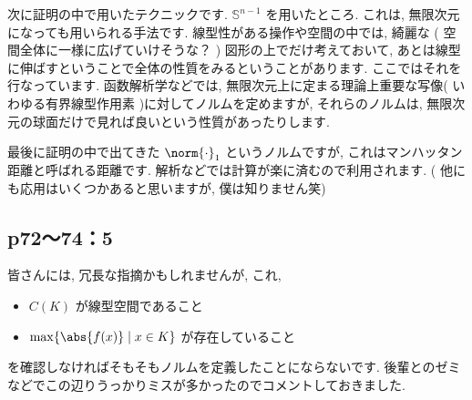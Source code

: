 \documentclass[uplatex,dvipdfmx,a4paper,10pt,fleqn]{jsarticle}
\begin{document}
次に証明の中で用いたテクニックです.  $\mathbb{S}^{n-1}$ を用いたところ. これは, 無限次元になっても用いられる手法です. 線型性がある操作や空間の中では, 綺麗な ( 空間全体に一様に広げていけそうな？ ) 図形の上でだけ考えておいて, あとは線型に伸ばすということで全体の性質をみるということがあります. ここではそれを行なっています. 函数解析学などでは, 無限次元上に定まる理論上重要な写像( いわゆる有界線型作用素 )に対してノルムを定めますが, それらのノルムは, 無限次元の球面だけで見れば良いという性質があったりします. 

最後に証明の中で出てきた $\norm{ \cdot } _ 1$ というノルムですが, これはマンハッタン距離と呼ばれる距離です. 解析などでは計算が楽に済むので利用されます. ( 他にも応用はいくつかあると思いますが, 僕は知りません笑)
\newpage

\subsection*{p72〜74：5}
皆さんには, 冗長な指摘かもしれませんが, これ, 
	\begin{itemize}
		\item $C ( K )$ が線型空間であること
		\item $\max \{ \abs{ f ( x )} \mid x \in K \}$ が存在していること
\end{itemize}
を確認しなければそもそもノルムを定義したことにならないです. 後輩とのゼミなどでこの辺りうっかりミスが多かったのでコメントしておきました. \\
\end{document}
